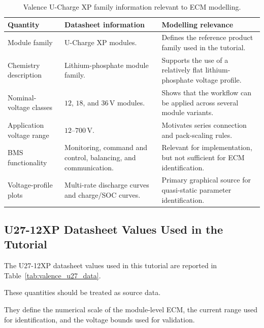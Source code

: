 \documentclass[a4paper,12pt]{article}
\begin{document}
\begin{table}[H]
\centering
\caption{Valence U-Charge XP family information relevant to ECM modelling.}
\label{tab:valence_family_overview}
\begin{tabularx}{0.98\textwidth}{@{}L{0.28\textwidth}L{0.26\textwidth}Y@{}}
\toprule
\textbf{Quantity} &
\textbf{Datasheet information} &
\textbf{Modelling relevance} \\
\midrule
Module family &
U-Charge XP modules. &
Defines the reference product family used in the tutorial. \\
Chemistry description &
Lithium-phosphate module family. &
Supports the use of a relatively flat lithium-phosphate voltage profile. \\
Nominal-voltage classes &
\(12\), \(18\), and \(36\,\mathrm{V}\) modules. &
Shows that the workflow can be applied across several module variants. \\
Application voltage range &
\(12\)--\(700\,\mathrm{V}\). &
Motivates series connection and pack-scaling rules. \\
BMS functionality &
Monitoring, command and control, balancing, and communication. &
Relevant for implementation, but not sufficient for ECM identification. \\
Voltage-profile plots &
Multi-rate discharge curves and charge/SOC curves. &
Primary graphical source for quasi-static parameter identification. \\
\bottomrule
\end{tabularx}
\end{table}

\subsection{U27-12XP Datasheet Values Used in the Tutorial}

The U27-12XP datasheet values used in this tutorial are reported in Table~\ref{tab:valence_u27_data}.

These quantities should be treated as source data.

They define the numerical scale of the module-level ECM, the current range used for identification, and the voltage bounds used for validation.
\end{document}
